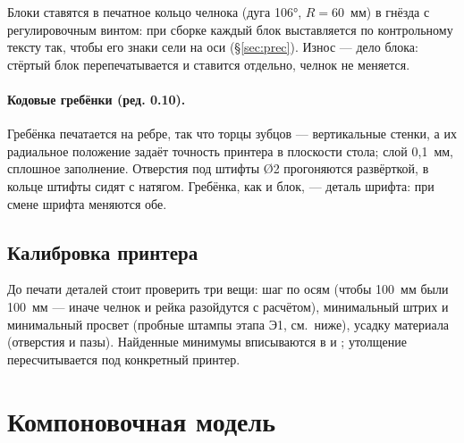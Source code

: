 Блоки ставятся в печатное кольцо челнока (дуга 106°, $R = 60$~мм) в гнёзда с регулировочным винтом: при сборке каждый блок выставляется по контрольному тексту так, чтобы его знаки сели на оси (\S\ref{sec:prec}). Износ — дело блока: стёртый блок перепечатывается и ставится отдельно, челнок не меняется.

\paragraph{Кодовые гребёнки (ред. 0.10).} Гребёнка печатается на ребре, так что торцы зубцов — вертикальные стенки, а их радиальное положение задаёт точность принтера в плоскости стола; слой 0,1~мм, сплошное заполнение. Отверстия под штифты Ø2 прогоняются развёрткой, в кольце штифты сидят с натягом. Гребёнка, как и блок, — деталь шрифта: при смене шрифта меняются обе.

\subsection{Калибровка принтера}

До печати деталей стоит проверить три вещи: шаг по осям (чтобы 100~мм были 100~мм — иначе челнок и рейка разойдутся с расчётом), минимальный штрих и минимальный просвет (пробные штампы этапа Э1, см.~ниже), усадку материала (отверстия и пазы). Найденные минимумы вписываются в  и ; утолщение пересчитывается под конкретный принтер.

\section{Компоновочная модель}
\label{sec:model}


